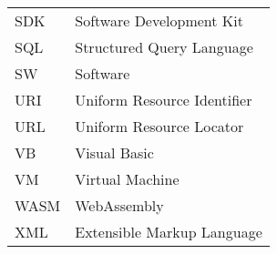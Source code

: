 \begin{tabular}{ll}
SDK & Software Development Kit \\
SQL & Structured Query Language \\
SW & Software \\
URI & Uniform Resource Identifier \\
URL & Uniform Resource Locator \\
VB & Visual Basic \\
VM & Virtual Machine \\
WASM & WebAssembly \\
XML & Extensible Markup Language \\
\end{tabular}

